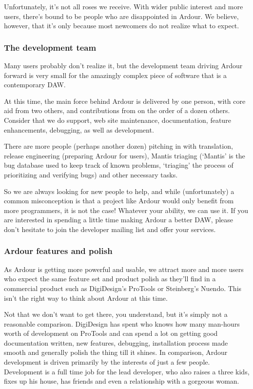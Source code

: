 \documentclass[10pt,a4paper]{book}
\begin{document}
Unfortunately, it's not all roses we receive.  With wider public
interest and more users, there's bound to be people who are
disappointed in Ardour. We believe, however, that it's only because
most newcomers do not realize what to expect.


\subsubsection{The development team}

Many users probably don't realize it, but the development team driving
Ardour forward is very small for the amazingly complex piece of
software that is a contemporary DAW\@.

At this time, the main force behind Ardour is delivered by one person,
with core aid from two others, and contributions from on the order of
a dozen others. Consider that we do support, web site maintenance,
documentation, feature enhancements, debugging, as well as
development.

There are more people (perhaps another dozen) pitching in with
translation, release engineering (preparing Ardour for users), Mantis
triaging (`Mantis' is the bug database used to keep track of known
problems, `triaging' the process of prioritizing and verifying bugs)
and other necessary tasks.

So we are always looking for new people to help, and while
(unfortunately) a common misconception is that a project like Ardour
would only benefit from more programmers, it is not the case! Whatever
your ability, we can use it. If you are interested in spending a
little time making Ardour a better DAW, please don't hesitate to join
the developer mailing list and offer your services.

\subsubsection{Ardour features and polish}

As Ardour is getting more powerful and usable, we attract more and
more users who expect the same feature set and product polish as
they'll find in a commercial product such as DigiDesign's ProTools or
Steinberg's Nuendo. This isn't the right way to think about Ardour at
this time.

Not that we don't want to get there, you understand, but it's simply
not a reasonable comparison. DigiDesign has spent who knows how many
man-hours worth of development on ProTools and can spend a lot on
getting good documentation written, new features, debugging,
installation process made smooth and generally polish the thing till
it shines. In comparison, Ardour development is driven primarily by
the interests of just a few people. Development is a full time job for
the lead developer, who also raises a three kids, fixes up his house,
has friends and even a relationship with a gorgeous woman.
\end{document}
